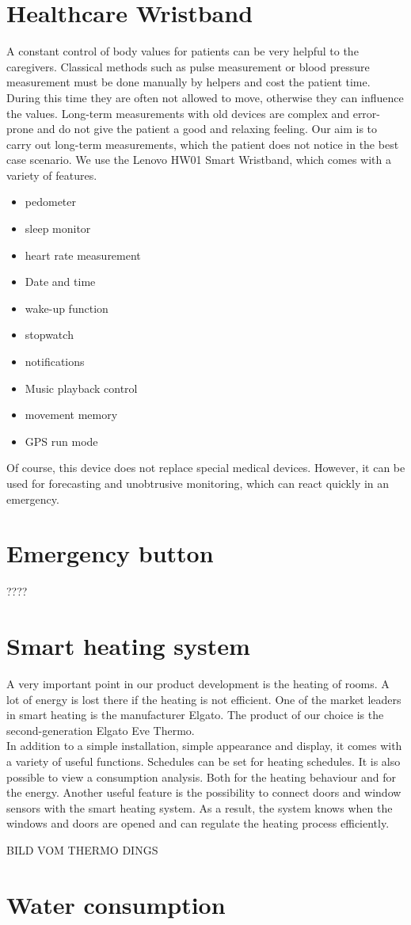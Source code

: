 \section{Healthcare Wristband}
A constant control of body values for patients can be very helpful to the caregivers. Classical methods such as pulse measurement or blood pressure measurement must be done manually by helpers and cost the patient time. During this time they are often not allowed to move, otherwise they can influence the values. Long-term measurements with old devices are complex and error-prone and do not give the patient a good and relaxing feeling. Our aim is to carry out long-term measurements, which the patient does not notice in the best case scenario. We use the Lenovo HW01 Smart Wristband, which comes with a variety of features. 
\begin{itemize}
	\item pedometer
	\item sleep monitor
	\item heart rate measurement
	\item Date and time
	\item wake-up function
	\item stopwatch
	\item notifications
	\item Music playback control
	\item movement memory
	\item GPS run mode
\end{itemize}
Of course, this device does not replace special medical devices. However, it can be used for forecasting and unobtrusive monitoring, which can react quickly in an emergency.

\section{Emergency button}
????

\section{Smart heating system}
A very important point in our product development is the heating of rooms. A lot of energy is lost there if the heating is not efficient. One of the market leaders in smart heating is the manufacturer Elgato. The product of our choice is the second-generation Elgato Eve Thermo. 
\\
In addition to a simple installation, simple appearance and display, it comes with a variety of useful functions. Schedules can be set for heating schedules. It is also possible to view a consumption analysis. Both for the heating behaviour and for the energy. Another useful feature is the possibility to connect doors and window sensors with the smart heating system. As a result, the system knows when the windows and doors are opened and can regulate the heating process efficiently.

BILD VOM THERMO DINGS

\section{Water consumption}

